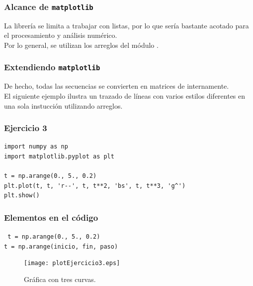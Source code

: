 \begin{frame}
\frametitle{Alcance de \texttt{matplotlib}}
La librería  se limita a trabajar con listas, por lo que sería bastante acotado para el procesamiento y análisis numérico.
\\
\medskip
Por lo general, se utilizan los arreglos del módulo .
\end{frame}
\begin{frame}
\frametitle{Extendiendo \texttt{matplotlib}}
De hecho, todas las secuencias se convierten en matrices de  internamente.
\\
\medskip
El siguiente ejemplo ilustra un trazado de líneas con varios estilos diferentes en una sola instucción utilizando arreglos.
\end{frame}
\begin{frame}[fragile]
\frametitle{Ejercicio 3}
\begin{lstlisting}[caption=Gráfica con \texttt{numpy},basicstyle=\linespread{1.2}\ttfamily\small, columns=fullflexible]
import numpy as np
import matplotlib.pyplot as plt

t = np.arange(0., 5., 0.2)
plt.plot(t, t, 'r--', t, t**2, 'bs', t, t**3, 'g^')
plt.show()
\end{lstlisting}
\end{frame}
\begin{frame}[fragile]
\frametitle{Elementos en el código}
\texttt{
t = np.arange(0., 5., 0.2)
\\
\bigskip
\vspace{1.5cm}
t = np.arange(inicio, fin, paso)
}
\end{frame}

\begin{frame}[fragile]
\begin{figure}
	\centering
	\texttt{[image: plotEjercicio3.eps]}
	\caption{Gráfica con tres curvas.}
\end{figure}
\end{frame}
